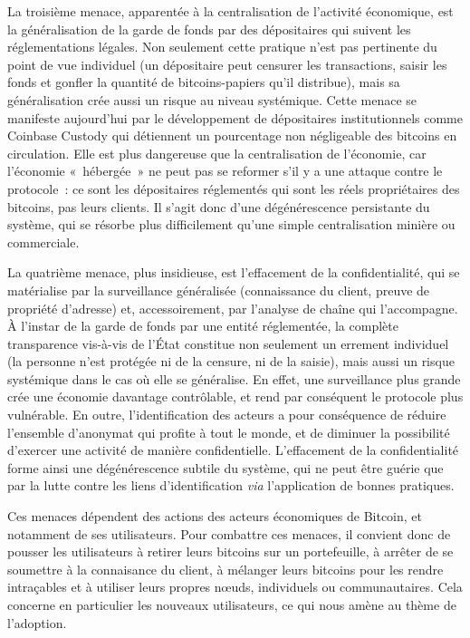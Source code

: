 La troisième menace, apparentée à la centralisation de l'activité économique, est la généralisation de la garde de fonds par des dépositaires qui suivent les réglementations légales. Non seulement cette pratique n'est pas pertinente du point de vue individuel (un dépositaire peut censurer les transactions, saisir les fonds et gonfler la quantité de bitcoins-papiers qu'il distribue), mais sa généralisation crée aussi un risque au niveau systémique. Cette menace se manifeste aujourd'hui par le développement de dépositaires institutionnels comme Coinbase Custody qui détiennent un pourcentage non négligeable des bitcoins en circulation. Elle est plus dangereuse que la centralisation de l'économie, car l'économie «~hébergée~» ne peut pas se reformer s'il y a une attaque contre le protocole~: ce sont les dépositaires réglementés qui sont les réels propriétaires des bitcoins, pas leurs clients. Il s'agit donc d'une dégénérescence persistante du système, qui se résorbe plus difficilement qu'une simple centralisation minière ou commerciale.

La quatrième menace, plus insidieuse, est l'effacement de la confidentialité, qui se matérialise par la surveillance généralisée (connaissance du client, preuve de propriété d'adresse) et, accessoirement, par l'analyse de chaîne qui l'accompagne. À l'instar de la garde de fonds par une entité réglementée, la complète transparence vis-à-vis de l'État constitue non seulement un errement individuel (la personne n'est protégée ni de la censure, ni de la saisie), mais aussi un risque systémique dans le cas où elle se généralise. En effet, une surveillance plus grande crée une économie davantage contrôlable, et rend par conséquent le protocole plus vulnérable. En outre, l'identification des acteurs a pour conséquence de réduire l'ensemble d'anonymat qui profite à tout le monde, et de diminuer la possibilité d'exercer une activité de manière confidentielle. L'effacement de la confidentialité forme ainsi une dégénérescence subtile du système, qui ne peut être guérie que par la lutte contre les liens d'identification \emph{via} l'application de bonnes pratiques. %

Ces menaces dépendent des actions des acteurs économiques de Bitcoin, et notamment de ses utilisateurs. Pour combattre ces menaces, il convient donc de pousser les utilisateurs à retirer leurs bitcoins sur un portefeuille, à arrêter de se soumettre à la connaisance du client, à mélanger leurs bitcoins pour les rendre intraçables et à utiliser leurs propres nœuds, individuels ou communautaires. Cela concerne en particulier les nouveaux utilisateurs, ce qui nous amène au thème de l'adoption.

